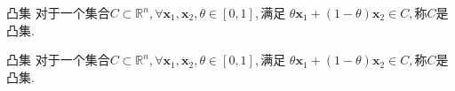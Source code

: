 
\begin{definition}{凸集}
对于一个集合$C\subset\mathbb{R}^n,\forall\boldsymbol{x}_1,\boldsymbol{x}_2,\theta\in[0,1],$满足
$\theta\boldsymbol{x}_1+(1-\theta)\boldsymbol{x}_2\in C,$称$C$是凸集.
\end{definition}
\begin{definition}{凸集}
对于一个集合$C\subset\mathbb{R}^n,\forall\boldsymbol{x}_1,\boldsymbol{x}_2,\theta\in[0,1],$满足
$\theta\boldsymbol{x}_1+(1-\theta)\boldsymbol{x}_2\in C,$称$C$是凸集.
\end{definition}